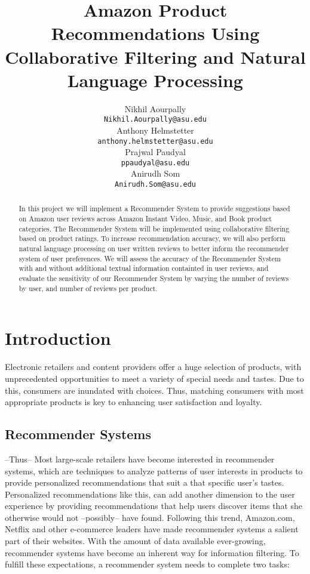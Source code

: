 \documentclass{article} %
\title{Amazon Product Recommendations Using Collaborative Filtering and Natural Language Processing  }
\author{
Nikhil Aourpally \\
\texttt{Nikhil.Aourpally@asu.edu} \\
\And
Anthony Helmstetter \\
\texttt{anthony.helmstetter@asu.edu} \\
\And
Prajwal Paudyal \\
\texttt{ppaudyal@asu.edu} \\
\And
Anirudh Som \\
\texttt{Anirudh.Som@asu.edu} \\
}
\begin{document}
\maketitle

\begin{abstract}
In this project we will implement a Recommender System to provide suggestions based on Amazon user reviews across Amazon Instant Video, Music, and Book product categories. The Recommender System will be implemented using collaborative filtering based on product ratings. To increase recommendation accuracy, we will also perform natural language processing on user written reviews to better inform the recommender system of user preferences. We will assess the accuracy of the Recommender System with and without additional textual information containted in user reviews, and evaluate the sensitivity of our Recommender System by varying the number of reviews by user, and number of reviews per product. 
\end{abstract}



\section{Introduction}
Electronic retailers and content providers offer a huge selection of products, with unprecedented opportunities to meet a variety of special needs and tastes. Due to this, consumers are inundated with choices. Thus, matching consumers with most appropriate products is key to enhancing user satisfaction and loyalty.
\subsection{Recommender Systems}
	--Thus-- Most large-scale retailers have become interested in recommender systems, which are techniques to analyze patterns of user interests in products to provide personalized recommendations that suit a that specific user's tastes. Personalized recommendations like this, can add another dimension to the user experience by providing recommendations that help users discover items that she otherwise would not --possibly-- have found. Following this trend, Amazon.com, Netflix and other e-commerce leaders have made recommender systems a salient part of their websites. With the amount of data available ever-growing, recommender systems have become an inherent way for information filtering. 
	To fulfill these expectations, a recommender system needs to complete two tasks: 
\end{document}
